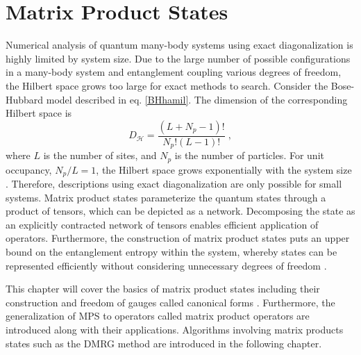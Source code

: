 \chapter{Matrix Product States} \label{chap:MPS}
Numerical analysis of quantum many-body systems using exact diagonalization is highly limited by system size. Due to the large number of possible configurations in a many-body system and entanglement coupling various degrees of freedom, the Hilbert space grows too large for exact methods to search.
Consider the Bose-Hubbard model described in eq. \eqref{BHhamil}. The dimension of the corresponding Hilbert space is
\begin{equation}
	D_{\mathcal{H}} = \frac{(L+N_p -1)!}{N_p ! (L-1)!} \; ,
	\label{eq:HilberSpaceScaling}
\end{equation}
where $L$ is the number of sites, and $N_p$ is the number of particles. For unit occupancy, $N_p / L = 1$, the Hilbert space grows exponentially with the system size \cite{Dong}. Therefore, descriptions using exact diagonalization are only possible for small systems.
Matrix product states parameterize the quantum states through a product of tensors, which can be depicted as a network. Decomposing the state as an explicitly contracted network of tensors enables efficient application of operators. Furthermore, the construction of matrix product states puts an upper bound on the entanglement entropy within the system, whereby states can be represented efficiently without considering unnecessary degrees of freedom \cite{Cramer}.

This chapter will cover the basics of matrix product states including their construction and freedom of gauges called canonical forms \cite{schollwock}. Furthermore, the generalization of MPS to operators called matrix product operators are introduced along with their applications. Algorithms involving matrix products states such as the DMRG method \cite{White1992,White1993} are introduced in the following chapter.


